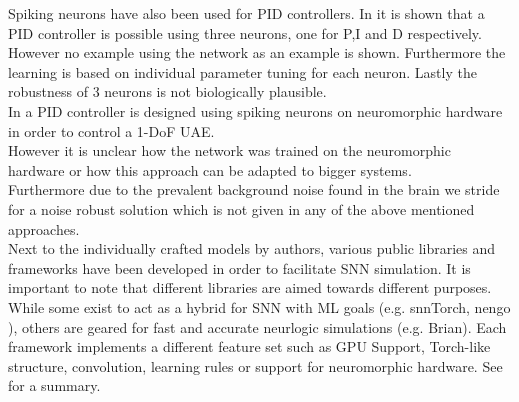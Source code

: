 Spiking neurons have also been used for PID controllers. In \cite{lu_spiking_2011} it is shown that a PID controller is possible using three neurons, one for P,I and D respectively. However no example using the network as an example is shown. Furthermore the learning is based on individual parameter tuning for each neuron. Lastly the robustness of 3 neurons is not biologically plausible.\\
In \cite{stagsted_towards_2020} a PID controller is designed using spiking neurons on neuromorphic hardware in order to control a 1-DoF UAE.\\
However it is unclear how the network was trained on the neuromorphic hardware or how this approach can be adapted to bigger systems.\\
Furthermore due to the prevalent background noise found in the brain we stride for a noise robust solution which is not given in any of the above mentioned approaches.\\
Next to the individually crafted models by authors, various public libraries and frameworks have been developed in order to facilitate \ac{SNN} simulation. It is important to note that different libraries are aimed towards different purposes. While some exist to act as a hybrid for \ac{SNN} with \ac{ML} goals (e.g. snnTorch\cite{eshraghian_training_2023}, nengo \cite{bekolay_nengo_2014}), others are geared for fast and accurate neurlogic simulations (e.g. Brian\cite{stimberg_brian_2019}). Each framework implements a different feature set such as \ac{GPU} Support, Torch-like structure, convolution, learning rules or support for neuromorphic hardware. See \cite{yamazaki_spiking_2022} for a summary.


